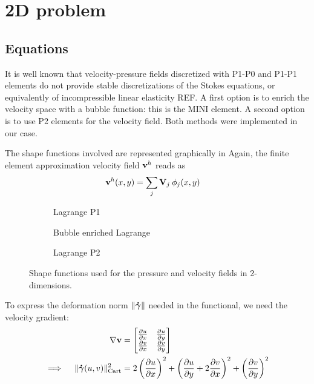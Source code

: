\documentclass[11 pt]{report}
\begin{document}
\chapter{2D problem}

\section{Equations}

It is well known that velocity-pressure fields discretized with P1-P0 and P1-P1 elements do not provide stable discretizations of the Stokes equations, or equivalently of incompressible linear elasticity REF. A first option is to enrich the velocity space with a bubble function: this is the MINI element. A second option is to use P2 elements for the velocity field. Both methods were implemented in our case. 

The shape functions involved are represented graphically in %
Again, the finite element approximation velocity field $\mathbf{v}^h$ reads as
\begin{align}
    \mathbf{v}^h(x, y) &= \sum_{j} \mathbf{V}_j \: \phi_j(x, y)
\end{align}

\begin{figure}[t]
    \centering
    \begin{subfigure}[t]{0.495\textwidth}
        
        \caption{Lagrange P1}
    \end{subfigure}
    \begin{subfigure}[t]{0.495\textwidth}
        
        \caption{Bubble enriched Lagrange}
    \end{subfigure}
    \begin{subfigure}[b]{\textwidth}
        
        \caption{Lagrange P2}
    \end{subfigure}
    \caption{Shape functions used for the pressure and velocity fields in 2-dimensions.}
    \label{fig:shape_functions_2d}
\end{figure} 

To express the deformation norm $\|\boldsymbol{\dot \gamma}\|$ needed in the functional, we need the velocity gradient:
\begin{align}
    \nabla \mathbf{v} &= 
    \begin{bmatrix}
        \pdv{u}{x} & \pdv{u}{y}\\
        \pdv{v}{x} & \pdv{v}{y}\\
    \end{bmatrix}\\
    \implies \quad \|\boldsymbol{\dot \gamma}(u, v)\|_{\text{Cart}}^2 &= 2 \left(\pdv{u}{x}\right)^2 + \left(\pdv{u}{y} + 2\pdv{v}{x}\right)^2 + \left(\pdv{v}{y}\right)^2
\end{align}
\end{document}
